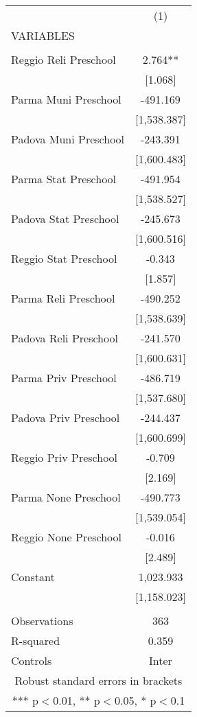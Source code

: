 \begin{tabular}{lc} \hline
 & (1) \\
VARIABLES &  \\ \hline
 &  \\
Reggio Reli Preschool & 2.764** \\
 & [1.068] \\
Parma Muni Preschool & -491.169 \\
 & [1,538.387] \\
Padova Muni Preschool & -243.391 \\
 & [1,600.483] \\
Parma Stat Preschool & -491.954 \\
 & [1,538.527] \\
Padova Stat Preschool & -245.673 \\
 & [1,600.516] \\
Reggio Stat Preschool & -0.343 \\
 & [1.857] \\
Parma Reli Preschool & -490.252 \\
 & [1,538.639] \\
Padova Reli Preschool & -241.570 \\
 & [1,600.631] \\
Parma Priv Preschool & -486.719 \\
 & [1,537.680] \\
Padova Priv Preschool & -244.437 \\
 & [1,600.699] \\
Reggio Priv Preschool & -0.709 \\
 & [2.169] \\
Parma None Preschool & -490.773 \\
 & [1,539.054] \\
Reggio None Preschool & -0.016 \\
 & [2.489] \\
Constant & 1,023.933 \\
 & [1,158.023] \\
 &  \\
Observations & 363 \\
R-squared & 0.359 \\
 Controls & Inter \\ \hline
\multicolumn{2}{c}{ Robust standard errors in brackets} \\
\multicolumn{2}{c}{ *** p$<$0.01, ** p$<$0.05, * p$<$0.1} \\
\end{tabular}
